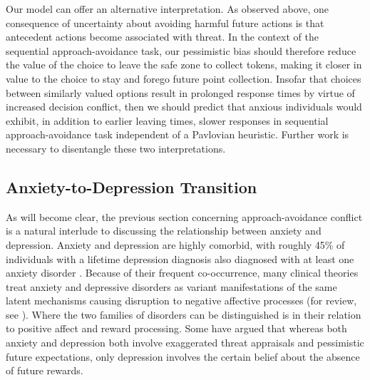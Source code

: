 \documentclass[11pt]{article} %
\begin{document}
Our model can offer an alternative interpretation. As observed above, one consequence of uncertainty about avoiding harmful future actions is that antecedent actions become associated with threat. In the context of the sequential approach-avoidance task, our pessimistic bias should therefore reduce the value of the choice to leave the safe zone to collect tokens, making it closer in value to the choice to stay and forego future point collection. Insofar that choices between similarly valued options result in prolonged response times by virtue of increased decision conflict, then we should predict that anxious individuals would exhibit, in addition to earlier leaving times, slower responses in sequential approach-avoidance task independent of a Pavlovian heuristic. Further work is necessary to disentangle these two interpretations. 

\subsection{Anxiety-to-Depression Transition}

As will become clear, the previous section concerning approach-avoidance conflict is a natural interlude to discussing the relationship between anxiety and depression. Anxiety and depression are highly comorbid, with roughly 45\% of individuals with a lifetime depression diagnosis also diagnosed with at least one anxiety disorder \citep{kessler2015}. Because of their frequent co-occurrence, many clinical theories treat anxiety and depressive disorders as variant manifestations of the same latent mechanisms causing disruption to negative affective processes (for review, see \cite{jacobson2014}). Where the two families of disorders can be distinguished is in their relation to positive affect and reward processing. Some have argued that whereas both anxiety and depression both involve exaggerated threat appraisals and pessimistic future expectations, only depression involves the certain belief about the absence of future rewards. 
\end{document}
